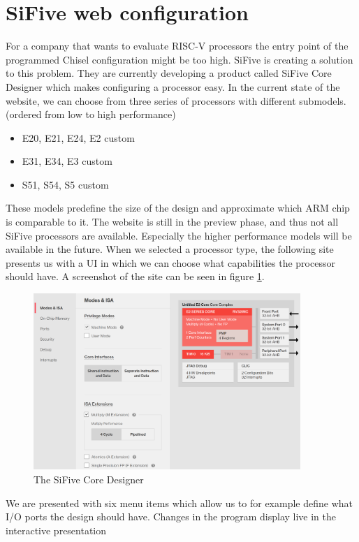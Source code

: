 \section{SiFive web configuration}
For a company that wants to evaluate RISC-V processors
the entry point of the programmed Chisel configuration might
be too high.
SiFive is creating a solution to this problem.
They are currently developing a product called
SiFive Core Designer which makes configuring a
processor easy.
In the current state of the website, we can choose
from three series of processors with different
submodels.
(ordered from low to high performance)
\begin{itemize}
    \item E20, E21, E24, E2 custom
    \item E31, E34, E3 custom
    \item S51, S54, S5 custom
\end{itemize}
\cite{sifive_core_designer} \newline
These models predefine the size of the design and approximate
which ARM chip is comparable to it.
The website is still in the preview phase, and thus not all
SiFive processors are available. Especially the higher
performance models will be available in the future.
When we selected a processor type, the following site
presents us with a UI in which we can choose what
capabilities the processor should have.
A screenshot of the site can be seen in figure
\ref{fig:sifive_core_designer}.
\begin{figure}
    \centering
    \includegraphics[width=0.9\textwidth]{figures/sifive_core_designer}
    \caption{The SiFive Core Designer \cite[Model: E20, connections added]{sifive_core_designer}}
    \label{fig:sifive_core_designer}
\end{figure}
We are presented with six menu items which allow us
to for example define what I/O ports the design should have.
Changes in the program display live in the interactive
presentation


